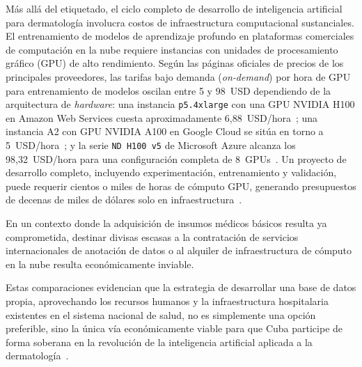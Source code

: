 Más allá del etiquetado, el ciclo completo de desarrollo de inteligencia artificial para dermatología 
involucra costos de infraestructura computacional sustanciales. El entrenamiento de modelos de 
aprendizaje profundo en plataformas comerciales de computación en la nube requiere instancias con 
unidades de procesamiento gráfico (GPU) de alto rendimiento. Según las páginas oficiales de precios 
de los principales proveedores, las tarifas bajo demanda (\textit{on-demand}) por hora de GPU 
para entrenamiento de modelos oscilan entre 5 y 98~USD dependiendo de la arquitectura de 
\textit{hardware}: una instancia \texttt{p5.4xlarge} con una GPU NVIDIA H100 en Amazon Web Services 
cuesta aproximadamente 6,88~USD/hora~\cite{aws_ec2_pricing}; una instancia A2 con GPU NVIDIA A100 
en Google Cloud se sitúa en torno a 5~USD/hora~\cite{gcp_gpu_pricing}; y la serie 
\texttt{ND H100 v5} de Microsoft Azure alcanza los 98,32~USD/hora para una configuración 
completa de 8~GPUs~\cite{azure_gpu_pricing}. Un proyecto de desarrollo completo, 
incluyendo experimentación, entrenamiento y validación, puede requerir cientos o miles de horas 
de cómputo GPU, generando presupuestos de decenas de miles de dólares solo en 
infraestructura~\cite{aws_ec2_pricing,gcp_gpu_pricing}.

En un contexto donde la adquisición de insumos médicos básicos resulta ya comprometida, destinar divisas 
escasas a la contratación de servicios internacionales de anotación de datos o al alquiler de 
infraestructura de cómputo en la nube resulta económicamente inviable.

Estas comparaciones evidencian que la estrategia de desarrollar una base de datos propia, aprovechando 
los recursos humanos y la infraestructura hospitalaria existentes en el sistema nacional de salud, no 
es simplemente una opción preferible, sino la única vía económicamente viable para que Cuba participe 
de forma soberana en la revolución de la inteligencia artificial aplicada a la 
dermatología~\cite{pmc_ciencia_innovacion_cuba,scielosp_ciencia_cuba}.





